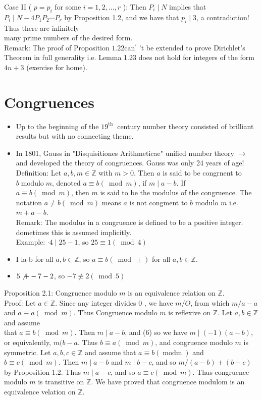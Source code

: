 \documentclass[10pt]{article}
\begin{document}
Case II ( $p=p_{i}$ for some $i=1,2, \ldots, r$ ): Then $P_{i} \mid N$ implies that $P_{i} \mid N-4 P_{1} P_{2} \cdots P_{r}$ by Proposition 1.2, and we have that $p_{i} \mid 3$, a contradiction! Thus there are infinitely\\
many prime numbers of the desired form.\\
Remark: The proof of Proposition $1.22 \mathrm{can}^{\prime}$ 't be extended to prove Dirichlet's Theorem in full generality i.e. Lemma 1.23 does not hold for integers of the form $4 n+3$ (exercise for home).

\section*{Congruences}
\begin{itemize}
  \item Up to the beginning of the $19^{\text {th }}$ century number theory consisted of brilliant results but with no connecting theme.
  \item In 1801, Gauss in "Disquisitiones Arithmeticae" unified number theory $\rightarrow$ and developed the theory of congruences. Gauss was only 24 years of age!\\
Definition: Let $a, b, m \in \mathbb{Z}$ with $m>0$. Then $a$ is said to be congrnent to $b \operatorname{modulo} m$, denoted $a \equiv b(\bmod m)$, if $m \mid a-b$. If\\
$a \equiv b(\bmod m)$, then $m$ is said to be the modulus of the congruence. The notation $a \neq b(\bmod m)$ means $a$ is not congment to $b$ modulo $m$ i.e. $m+a-b$.\\
Remark: The modulus in a congruence is defined to be a positive integer. dometimes this is assumed implicitly.\\
Example: $\cdot 4 \mid 25-1$, so $25 \equiv 1(\bmod 4)$
  \item I la-b for all $a, b \in \mathbb{Z}$, so $a \equiv b(\bmod \pm)$ for all $a, b \in \mathbb{Z}$.
  \item $5 \not+-7-2$, so $-7 \not \equiv 2(\bmod 5)$
\end{itemize}

Proposition 2.1: Congruence modulo $m$ is an equivalence relation on $\mathbb{Z}$.\\
Proof: Let $a \in \mathbb{Z}$. Since any integer divides 0 , we have $m / O$, from which $m / a-a$ and $a \equiv a(\bmod m)$. Thus Congruence modulo $m$ is reflexive on $\mathbb{Z}$. Let $a, b \in \mathbb{Z}$ and assume\\
that $a \equiv b(\bmod m)$. Then $m \mid a-b$, and (6) so we have $m \mid(-1)(a-b)$, or equivalently, $m(b-a$. Thus $b \equiv a(\bmod m)$, and congruence modulo $m$ is symmetric. Let $a, b, c \in \mathbb{Z}$ and assume that $a \equiv b(\operatorname{modm})$ and $b \equiv c(\bmod m)$. Then $m \mid a-b$ and $m \mid b-c$, and so $m /(a-b)+(b-c)$ by Proposition 1.2. Thus $m \mid a-c$, and so $a \equiv c(\bmod m)$. Thus congruence modulo $m$ is transitive on $\mathbb{Z}$. We have proved that congruence modulom is an equivalence velation on $\mathbb{Z}$.
\end{document}
